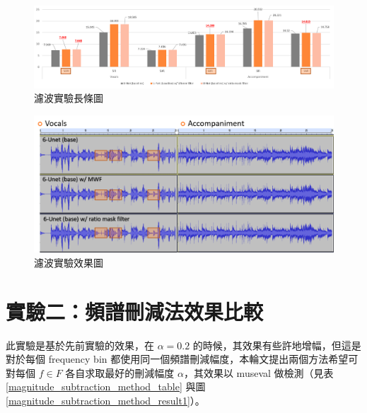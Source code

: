 \begin{figure}[htbp]
    \hfil
    \begin{minipage}[t]{1.0\textwidth}
        \includegraphics[width=\textwidth]{./figures/chapter05_result/filter_result1.png}
        \caption {濾波實驗長條圖}
        \label{filter_result1}
    \end{minipage}
    \hfil
\end{figure}

\begin{figure}[htbp]
    \hfil
    \begin{minipage}[t]{1.0\textwidth}
        \includegraphics[width=\textwidth]{./figures/chapter05_result/filter_result2.png}
        \caption {濾波實驗效果圖}
        \label{filter_result2}
    \end{minipage}
    \hfil
\end{figure}

\clearpage

\section{實驗二：頻譜刪減法效果比較}
此實驗是基於先前實驗的效果，在 $\alpha=0.2$ 的時候，其效果有些許地增幅，但這是對於每個 frequency bin 都使用同一個頻譜刪減幅度，本輪文提出兩個方法希望可對每個 $f \in F$ 各自求取最好的刪減幅度 $\alpha$，其效果以 museval 做檢測（見表\ref{magnitude_subtraction_method_table} 與圖\ref{magnitude_subtraction_method_result1}）。


